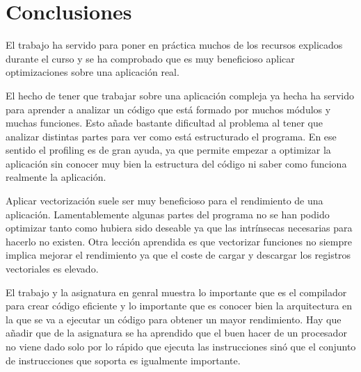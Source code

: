 \section{Conclusiones}

El trabajo ha servido para poner en pr\'{a}ctica muchos de los recursos
explicados durante el curso y se ha comprobado que es muy beneficioso aplicar
optimizaciones sobre una aplicaci\'{o}n real. 

El hecho de tener que trabajar sobre una aplicaci\'{o}n compleja ya hecha ha
servido para aprender a analizar un c\'{o}digo que est\'{a} formado por muchos
m\'{o}dulos y muchas funciones. Esto a\~{n}ade bastante dificultad al problema
al tener que analizar distintas partes para ver como est\'{a} estructurado el
programa. En ese sentido el profiling es de gran ayuda, ya que permite empezar
a optimizar la aplicaci\'{o}n sin conocer muy bien la estructura del c\'{o}digo
ni saber como funciona realmente la aplicaci\'{o}n.

Aplicar vectorizaci\'{o}n suele ser muy beneficioso para el rendimiento de una
aplicaci\'{o}n. Lamentablemente algunas partes del programa no se han podido
optimizar tanto como hubiera sido deseable ya que las intr\'{i}nsecas necesarias
para hacerlo no existen. Otra lecci\'{o}n aprendida es que vectorizar funciones
no siempre implica mejorar el rendimiento ya que el coste de cargar y descargar
los registros vectoriales es elevado.

El trabajo y la asignatura en genral muestra lo importante que es el compilador
para crear c\'{o}digo eficiente y lo importante que es conocer bien la
arquitectura en la que se va a ejecutar un c\'{o}digo para obtener un mayor
rendimiento. Hay que a\~{n}adir que de la asignatura se ha aprendido que el
buen hacer de un procesador no viene dado solo por lo r\'{a}pido que
ejecuta las instrucciones sin\'{o} que el conjunto de instrucciones que soporta
es igualmente importante.

